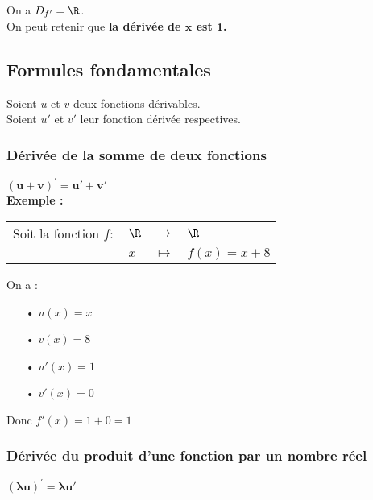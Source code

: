 \vspace*{.3cm}

On a $D_{f'} = \R$. \\

On peut retenir que \textbf{la dérivée de $\mathbf{x}$ est $\mathbf{1}$.}

\newpage

\subsection{Formules fondamentales}

Soient $u$ et $v$ deux fonctions dérivables. \\ Soient $u'$ et $v'$ leur fonction dérivée respectives. 

\subsubsection{Dérivée de la somme de deux fonctions}

$\mathbf{\left(u + v\right)^{'} = u' + v'}$ \\

\textbf{Exemple :} \\

\begin{tabular}{llll}
Soit la fonction $f :$ & $\R$ & $\longrightarrow$ & $\R$ \\
& $x$ & $\longmapsto$ & $f(x) = x + 8$ \\
\end{tabular}

\vspace*{.3cm}

On a : \\

\begin{itemize}
\item[•] $u\left(x\right) = x$
\item[•] $v\left(x\right) = 8$
\item[•] $u'\left(x\right) = 1$
\item[•] $v'\left(x\right) = 0$
\end{itemize}

Donc $f'(x) = 1 + 0 = 1$ 

\subsubsection{Dérivée du produit d'une fonction par un nombre réel}

$\mathbf{\left(\lambda u\right)^{'} = \lambda u'}$ \\

